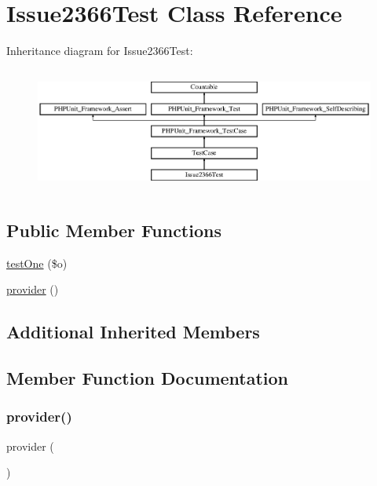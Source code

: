 \hypertarget{class_issue2366_test}{}\section{Issue2366\+Test Class Reference}
\label{class_issue2366_test}
Inheritance diagram for Issue2366\+Test\+:\begin{figure}[H]
\begin{center}
\leavevmode
\includegraphics[height=4.129793cm]{class_issue2366_test}
\end{center}
\end{figure}
\subsection*{Public Member Functions}
\begin{DoxyCompactItemize}
\item 
\mbox{\hyperlink{class_issue2366_test_a094aa59b900c7b2941a47124f5e5cf5b}{test\+One}} (\$o)
\item 
\mbox{\hyperlink{class_issue2366_test_a141540808e5970d27589425027e66cc9}{provider}} ()
\end{DoxyCompactItemize}
\subsection*{Additional Inherited Members}


\subsection{Member Function Documentation}
\mbox{\label{class_issue2366_test_a141540808e5970d27589425027e66cc9}} 
\subsubsection{\texorpdfstring{provider()}{provider()}}
{\footnotesize\ttfamily provider (\begin{DoxyParamCaption}{ }\end{DoxyParamCaption})}

